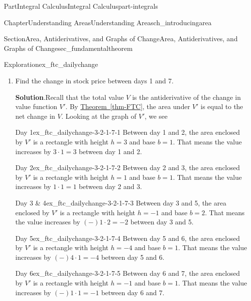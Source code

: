 \documentclass[oneside,10pt,]{tufte-book}
\newcommand{\blocktitlefont}{\relax}
\newcommand{\xreffont}{\relax}
\numberwithin{equation}{chapter}
\begin{document}
\begin{partptx}{Part}{Integral Calculus}{}{Integral Calculus}{}{}{part-integrals}
\begin{chapterptx}{Chapter}{Understanding Areas}{}{Understanding Areas}{}{}{ch_introducingarea}
\begin{sectionptx}{Section}{Area, Antiderivatives, and Graphs of Change}{}{Area, Antiderivatives, and Graphs of Change}{}{}{sec_fundamentaltheorem}
\begin{exploration}{Exploration}{}{ex_ftc_dailychange}
\begin{enumerate}[font=\bfseries,label=(\alph*),ref=\alph*]
\begin{image}{0.25}{0.5}{0.25}{}
{
}%
\end{image}%
\item{}Find the change in stock price between days 1 and 7.%
\par\smallskip%
\noindent\textbf{\blocktitlefont Solution}.\hypertarget{ex_ftc_dailychange-3-2}{}\quad{}Recall that the total value \(V\) is the antiderivative of the change in value function  \(V'\). By \hyperref[thm-FTC]{Theorem~{\xreffont\ref{thm-FTC}}}, the area under \(V'\) is equal to the net change in \(V\).  Looking at the graph of \(V'\), we see%
\begin{descriptionlist}
\begin{dlimedium}{Day 1}{ex_ftc_dailychange-3-2-1-7-1}%
Between day 1 and 2, the area enclosed by \(V'\) is a rectangle with height \(h=3\) and base \(b=1\). That means the value increases by \(3\cdot 1= 3\)\textdollar{} between day 1 and 2.%
\end{dlimedium}%
\begin{dlimedium}{Day 2}{ex_ftc_dailychange-3-2-1-7-2}%
Between day 2 and 3, the area enclosed by \(V'\) is a rectangle with height \(h=1\) and base \(b=1\). That means the value increases by \(1\cdot 1 = 1\)\textdollar{} between day 2 and 3.%
\end{dlimedium}%
\begin{dlimedium}{Day 3 \& 4}{ex_ftc_dailychange-3-2-1-7-3}%
Between day 3 and 5, the area enclosed by \(V'\) is a rectangle with height \(h=-1\) and base \(b=2\). That means the value increases by \((-) 1\cdot 2 = -2 \)\textdollar{} between day 3 and 5.%
\end{dlimedium}%
\begin{dlimedium}{Day 5}{ex_ftc_dailychange-3-2-1-7-4}%
Between day 5 and 6, the area enclosed by \(V'\) is a rectangle with height \(h=-4\) and base \(b=1\). That means the value increases by \((-) 4\cdot 1 = -4 \)\textdollar{} between day 5 and 6.%
\end{dlimedium}%
\begin{dlimedium}{Day 6}{ex_ftc_dailychange-3-2-1-7-5}%
Between day 6 and 7, the area enclosed by \(V'\) is a rectangle with height \(h=-1\) and base \(b=1\). That means the value increases by \((-) 1\cdot 1 = -1 \)\textdollar{} between day 6 and 7.%
\end{dlimedium}%
\end{descriptionlist}

\end{enumerate}
\end{exploration}
\end{sectionptx}
\end{chapterptx}
\end{partptx}
\end{document}
